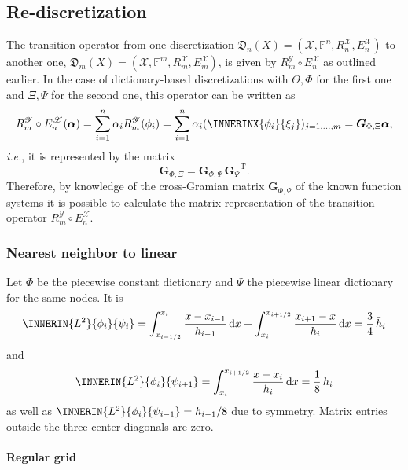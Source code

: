 \documentclass[a4paper]{paper}
\newcommand*{\SPC}[1]{{\ensuremath{\mathscr{#1}}}}
\newcommand*{\SPCX}{\SPC{X}}
\newcommand*{\FIELD}{{\ensuremath{\mathbb{F}}}}
\newcommand*{\Fn}{{\ensuremath{\FIELD^n}}}
\newcommand*{\Fm}{{\ensuremath{\FIELD^m}}}
\newcommand*{\EXT}[2]{\ensuremath{E_{#1}^{#2}}}
\newcommand*{\REST}[2]{\ensuremath{R_{#1}^{#2}}}
\newcommand*{\RnX}{{\ensuremath{\REST{n}{\SPC{X}}}}}
\newcommand*{\RmX}{{\ensuremath{\REST{m}{\SPC{X}}}}}
\newcommand*{\RmY}{{\ensuremath{\REST{m}{\SPC{Y}}}}}
\newcommand*{\EnX}{{\ensuremath{\EXT{n}{\SPC{X}}}}}
\newcommand*{\EmX}{{\ensuremath{\EXT{m}{\SPC{X}}}}}
\newcommand*{\DISCR}[2]{{\ensuremath{\mathfrak{D}_{#1}(#2)}}}
\newcommand*{\DISCRnX}{\DISCR{n}{X}}
\newcommand*{\D}{{\ensuremath{\mathrm{d}}}}
\newcommand*{\ie}{\textsl{i.e.}\xspace}
\newcommand*{\BDalpha}{\boldsymbol{\alpha}}
\newcommand*{\BDG}{\boldsymbol{G}}
\begin{document}
\subsection{Re-discretization}
\label{subsec:specif:rediscr}

The transition operator from one discretization $\DISCRnX = (\SPCX, \Fn, \RnX, \EnX)$ to another one,
$\DISCR{m}{X} = (\SPCX, \Fm, \RmX, \EmX)$, is given by $\RmY \circ \EnX$ as outlined earlier. In the case of 
dictionary-based discretizations with $\Theta, \Phi$ for the first one and $\Xi, \Psi$ for the second one, this 
operator can be written as
%
\begin{equation*}
 \RmY \circ \EnX(\BDalpha) 
 = \sum_{i=1}^n \alpha_i \RmY(\phi_i)
 = \sum_{i=1}^n \alpha_i (\INNERINX{\phi_i}{\xi_j})_{j=1,\dots,m}
 = \BDG_{\Phi,\Xi} \BDalpha,
\end{equation*}
%
\ie, it is represented by the matrix
%
\begin{equation*}
 \BDG_{\Phi,\Xi} = \BDG_{\Phi,\Psi}\, \BDG_\Psi^{-\mathrm{T}}.
\end{equation*}
%
Therefore, by knowledge of the cross-Gramian matrix $\BDG_{\Phi,\Psi}$ of the known function systems it is possible 
to calculate the matrix representation of the transition operator $\RmY \circ \EnX$.


\subsubsection{Nearest neighbor to linear}
\label{subsubsec:specif:rediscr:nn2lin}

Let $\Phi$ be the piecewise constant dictionary and $\Psi$ the piecewise linear dictionary for the same nodes. It is
%
\begin{equation*}
 \INNERIN{L^2}{\phi_i}{\psi_i} 
 = \int_{x_{i-1/2}}^{x_i} \frac{x-x_{i-1}}{h_{i-1}}\, \D x +
 \int_{x_i}^{x_{i+1/2}} \frac{x_{i+1} - x}{h_i}\, \D x
 = \frac{3}{4}\, \bar h_i
\end{equation*}
%
and
%
\begin{equation*}
 \INNERIN{L^2}{\phi_i}{\psi_{i+1}} 
 = \int_{x_i}^{x_{i+1/2}} \frac{x - x_i}{h_i}\, \D x
 = \frac{1}{8}\, h_i
\end{equation*}
%
as well as $\INNERIN{L^2}{\phi_i}{\psi_{i-1}} = h_{i-1}/8$ due to symmetry. Matrix entries outside the 
three center diagonals are zero.

\paragraph{Regular grid}
\end{document}
